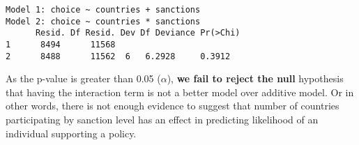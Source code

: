 \documentclass[12pt,letterpaper]{article}
\begin{document}
\begin{enumerate}
\begin{enumerate}
\begin{itemize}
\begin{Verbatim}
Model 1: choice ~ countries + sanctions
Model 2: choice ~ countries * sanctions
      Resid. Df Resid. Dev Df Deviance Pr(>Chi)
1      8494      11568                     
2      8488      11562  6   6.2928     0.3912
\end{Verbatim}
As the p-value is greater than 0.05 ($\alpha$), \textbf{we fail to reject the null} hypothesis that having the interaction term is not a better model over additive model. Or in other words, there is not enough evidence to suggest that number of countries participating by sanction level has an effect in predicting likelihood of an individual supporting a policy.

		\end{itemize}
	\end{enumerate}
	\end{enumerate}
\end{document}
